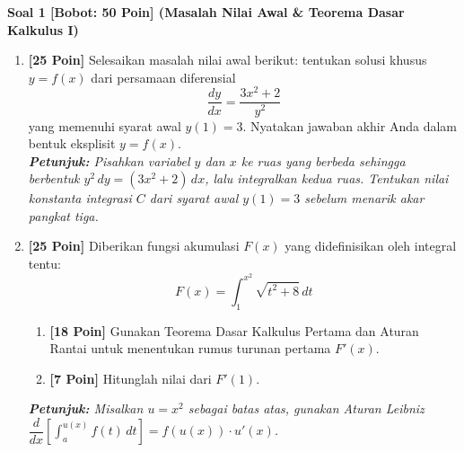 \documentclass[11pt,a4paper]{article}
\begin{document}
\noindent\textbf{Soal 1 [Bobot: 50 Poin] (Masalah Nilai Awal \& Teorema Dasar Kalkulus I)}
\begin{enumerate}[label=(\alph*), leftmargin=22pt]
    \item \textbf{[25 Poin]} Selesaikan masalah nilai awal berikut: tentukan solusi khusus $y = f(x)$ dari persamaan diferensial
    \[
    \frac{dy}{dx} = \frac{3x^2 + 2}{y^2}
    \]
    yang memenuhi syarat awal $y(1) = 3$. Nyatakan jawaban akhir Anda dalam bentuk eksplisit $y = f(x)$.\\
    \textit{\small\textbf{Petunjuk:} Pisahkan variabel $y$ dan $x$ ke ruas yang berbeda sehingga berbentuk $y^2\,dy = (3x^2 + 2)\,dx$, lalu integralkan kedua ruas. Tentukan nilai konstanta integrasi $C$ dari syarat awal $y(1) = 3$ sebelum menarik akar pangkat tiga.}
    
    \vspace{8pt}
    \item \textbf{[25 Poin]} Diberikan fungsi akumulasi $F(x)$ yang didefinisikan oleh integral tentu:
    \[
    F(x) = \int_{1}^{x^2} \sqrt{t^2 + 8}\,dt
    \]
    \begin{enumerate}[label=(\roman*)]
        \item \textbf{[18 Poin]} Gunakan Teorema Dasar Kalkulus Pertama dan Aturan Rantai untuk menentukan rumus turunan pertama $F'(x)$.
        \item \textbf{[7 Poin]} Hitunglah nilai dari $F'(1)$.
    \end{enumerate}
    \textit{\small\textbf{Petunjuk:} Misalkan $u = x^2$ sebagai batas atas, gunakan Aturan Leibniz $\dfrac{d}{dx}\left[\int_a^{u(x)} f(t)\,dt\right] = f(u(x))\cdot u'(x)$.}
\end{enumerate}

\vspace{14pt}
\end{document}
